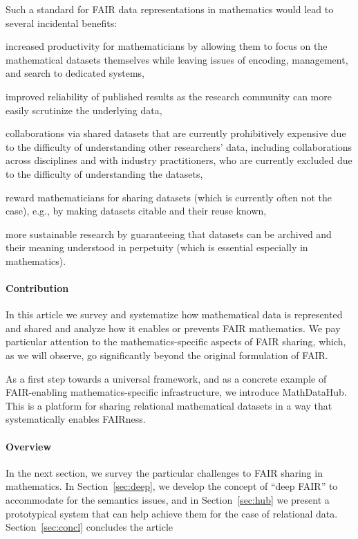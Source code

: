 Such a standard for FAIR data representations in mathematics would lead to several incidental benefits:
\begin{compactitem}
\item increased productivity for mathematicians by allowing them to focus on the mathematical datasets themselves while leaving issues of encoding, management, and search to dedicated systems,
\item improved reliability of published results as the research community can more easily scrutinize the underlying data,
\item collaborations via shared datasets that are currently prohibitively expensive due to the difficulty of understanding other researchers' data, including collaborations across disciplines and with industry practitioners, who are currently excluded due to the difficulty of understanding the datasets,
\item reward mathematicians for sharing datasets (which is currently often not the case), e.g., by making datasets citable and their reuse known,
\item more sustainable research by guaranteeing that datasets can be archived and their meaning understood in perpetuity (which is essential especially in mathematics).
\end{compactitem}

\paragraph{Contribution}
In this article we survey and systematize how mathematical data is represented and shared and analyze how it enables or prevents FAIR mathematics.
We pay particular attention to the mathematics-specific aspects of FAIR sharing, which, as we will observe, go significantly beyond the original formulation of FAIR.

As a first step towards a universal framework, and as a concrete example of FAIR-enabling mathematics-specific infrastructure, we introduce MathDataHub.
This is a platform for sharing relational mathematical datasets in a way that systematically enables FAIRness.

\paragraph{Overview}
In the next section, we survey the particular challenges to FAIR sharing in mathematics.
In Section~\ref{sec:deep}, we develop the concept of ``deep FAIR'' to accommodate for the semantics issues, and in Section~\ref{sec:hub} we present a prototypical system that can help achieve them for the case of relational data.
Section~\ref{sec:concl} concludes the article

